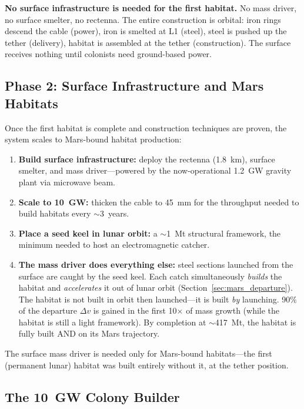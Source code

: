 \documentclass[12pt,letterpaper]{article}
\begin{document}
\textbf{No surface infrastructure is needed for the first habitat.} No mass driver, no surface smelter, no rectenna. The entire construction is orbital: iron rings descend the cable (power), iron is smelted at L1 (steel), steel is pushed up the tether (delivery), habitat is assembled at the tether (construction). The surface receives nothing until colonists need ground-based power.

\subsection{Phase 2: Surface Infrastructure and Mars Habitats}

Once the first habitat is complete and construction techniques are proven, the system scales to Mars-bound habitat production:

\begin{enumerate}[nosep]
\item \textbf{Build surface infrastructure:} deploy the rectenna (1.8~km), surface smelter, and mass driver---powered by the now-operational 1.2~GW gravity plant via microwave beam.
\item \textbf{Scale to 10~GW:} thicken the cable to 45~mm for the throughput needed to build habitats every ${\sim}$3~years.
\item \textbf{Place a seed keel in lunar orbit:} a ${\sim}$1~Mt structural framework, the minimum needed to host an electromagnetic catcher.
\item \textbf{The mass driver does everything else:} steel sections launched from the surface are caught by the seed keel. Each catch simultaneously \emph{builds} the habitat and \emph{accelerates} it out of lunar orbit (Section~\ref{sec:mars_departure}). The habitat is not built in orbit then launched---it is built \emph{by} launching. 90\% of the departure $\Delta v$ is gained in the first 10$\times$ of mass growth (while the habitat is still a light framework). By completion at ${\sim}$417~Mt, the habitat is fully built AND on its Mars trajectory.
\end{enumerate}

The surface mass driver is needed only for Mars-bound habitats---the first (permanent lunar) habitat was built entirely without it, at the tether position.

\subsection{The 10~GW Colony Builder}
\end{document}
